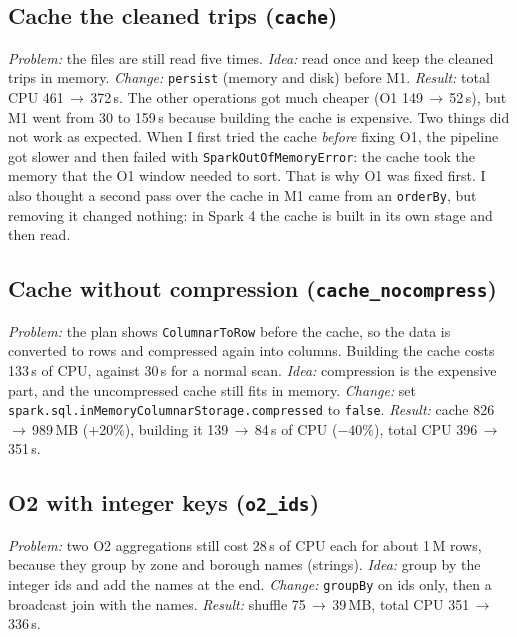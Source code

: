 \documentclass[sigconf]{acmart}
\begin{document}
\subsection{Cache the cleaned trips (\texttt{cache})}
\emph{Problem:} the files are still read five times. \emph{Idea:} read once
and keep the cleaned trips in memory. \emph{Change:} \texttt{persist}
(memory and disk) before M1. \emph{Result:} total CPU 461\,$\to$\,372\,s.
The other operations got much cheaper (O1 149\,$\to$\,52\,s), but M1 went
from 30 to 159\,s because building the cache is expensive.
Two things did not work as expected. When I first tried the cache
\emph{before} fixing O1, the pipeline got slower and then failed with
\texttt{SparkOutOfMemoryError}: the cache took the memory that the O1 window
needed to sort. That is why O1 was fixed first. I also thought a second pass
over the cache in M1 came from an \texttt{orderBy}, but removing it changed
nothing: in Spark 4 the cache is built in its own stage and then read.

\subsection{Cache without compression (\texttt{cache\_nocompress})}
\emph{Problem:} the plan shows \texttt{ColumnarToRow} before the cache, so the
data is converted to rows and compressed again into columns. Building the
cache costs 133\,s of CPU, against 30\,s for a normal scan. \emph{Idea:}
compression is the expensive part, and the uncompressed cache still fits in
memory. \emph{Change:} set
\texttt{spark.sql.inMemory\-ColumnarStorage\-.compressed} to \texttt{false}.
\emph{Result:} cache 826\,$\to$\,989\,MB (+20\%), building it 139\,$\to$\,84\,s
of CPU ($-40\%$), total CPU 396\,$\to$\,351\,s.

\subsection{O2 with integer keys (\texttt{o2\_ids})}
\emph{Problem:} two O2 aggregations still cost 28\,s of CPU each for about 1\,M
rows, because they group by zone and borough names (strings).
\emph{Idea:} group by the integer ids and add the names at the end.
\emph{Change:} \texttt{groupBy} on ids only, then a broadcast join with the
names. \emph{Result:} shuffle 75\,$\to$\,39\,MB, total CPU 351\,$\to$\,336\,s.
\end{document}
